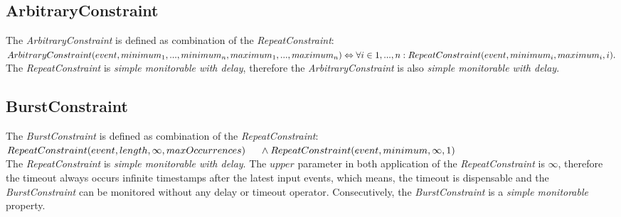 \subsection{ArbitraryConstraint}
	The \emph{ArbitraryConstraint} is defined as combination of the \emph{RepeatConstraint}:\\[10pt]
	\begin{math}
		ArbitraryConstraint(event, minimum_1, ..., minimum_n, maximum_1, ..., maximum_n)\\
		\Leftrightarrow \forall i\in{1, ..., n}: RepeatConstraint(event, minimum_i, maximum_i, i).
	\end{math}\\[10pt]
	The \emph{RepeatConstraint} is \textit{simple monitorable with delay}, therefore the \emph{ArbitraryConstraint} is also \textit{simple monitorable with delay}.
	
\subsection{BurstConstraint}
	The \emph{BurstConstraint} is defined as combination of the \emph{RepeatConstraint}:\\[10pt]
	\begin{math}
		RepeatConstraint(event, length, \infty, maxOccurrences)\\
		\text{\hspace{.5cm}}\land RepeatConstraint(event, minimum, \infty, 1)
	\end{math}\\[10pt]
	The \emph{RepeatConstraint} is \textit{simple monitorable with delay}. The $upper$ parameter in both application of the \textit{RepeatConstraint} is $\infty$, therefore the timeout always occurs infinite timestamps after the latest input events, which means, the timeout is dispensable and the \emph{BurstConstraint} can be monitored without any delay or timeout operator. Consecutively, the \emph{BurstConstraint} is a \textit{simple monitorable} property.

